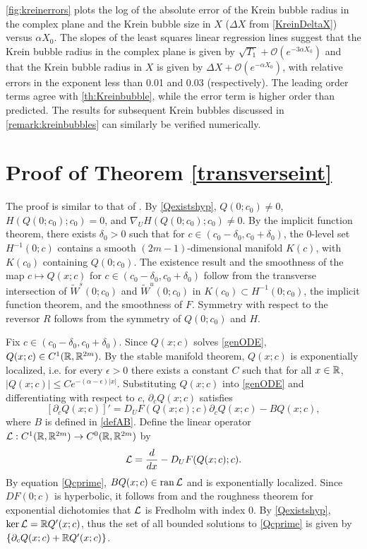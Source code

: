 \documentclass[12pt]{elsarticle}
\theoremstyle{plain}
\theoremstyle{definition}
\theoremstyle{remark}
\numberwithin{theorem}{section}
\numberwithin{equation}{section}
\begin{document}
\cref{fig:kreinerrors} plots the log of the absolute error of the Krein bubble radius in the complex plane and the Krein bubble size in $X$ ($\Delta X$ from \cref{KreinDeltaX}) versus $\alpha X_0$. The slopes of the least squares linear regression lines suggest that the Krein bubble radius in the complex plane is given by $\sqrt{T_1} + \mathcal{O}(e^{-3 \alpha X_0})$ and that the Krein bubble radius in $X$ is given by $\Delta X + \mathcal{O}(e^{-\alpha X_0})$, with relative errors in the exponent less than 0.01 and 0.03 (respectively). The leading order terms agree with \cref{th:Kreinbubble}, while the error term is higher order than predicted. The results for subsequent Krein bubbles discussed in \cref{remark:kreinbubbles} can similarly be verified numerically.

\section{Proof of Theorem \ref{transverseint}}\label{sec:transverseintproof}

The proof is similar to that of \cite[Lemma 6.2 and Lemma 6.4]{Kapitula2020}. By \cref{Qexistshyp}, $Q(0; c_0) \neq 0$, $H(Q(0; c_0); c_0) = 0$, and $\nabla_U H(Q(0; c_0); c_0) \neq 0$. By the implicit function theorem, there exists $\delta_0 > 0$ such that for $c \in (c_0 - \delta_0, c_0 + \delta_0)$, the 0-level set $H^{-1}(0; c)$ contains a smooth $(2m-1)$-dimensional manifold $K(c)$, with $K(c_0)$ containing $Q(0; c_0)$. The existence result and the smoothness of the map $c \mapsto Q(x; c)$ for $c \in (c_0 - \delta_0, c_0 + \delta_0)$ follow from the transverse intersection of $\tilde{W}^s(0; c_0)$ and $\tilde{W}^u(0; c_0)$ in $K(c_0) \subset H^{-1}(0; c_0)$, the implicit function theorem, and the smoothness of $F$. Symmetry with respect to the reversor $R$ follows from the symmetry of $Q(0; c_0)$ and $H$.

Fix $c \in (c_0 - \delta_0, c_0 + \delta_0)$. Since $Q(x; c)$ solves \cref{genODE}, $Q(x; c) \in C^1(\mathbb{R}, \mathbb{R}^{2m})$. By the stable manifold theorem, $Q(x; c)$ is exponentially localized, i.e. for every $\epsilon > 0$ there exists a constant $C$ such that for all $x \in \mathbb{R}$, $|Q(x; c)| \leq C e^{-(\alpha - \epsilon)|x|}$. Substituting $Q(x; c)$ into \cref{genODE} and differentiating with respect to $c$, $\partial_c Q(x; c)$ satisfies
\begin{equation}\label{Qcprime}
[\partial_c Q(x; c)]' = D_U F(Q(x;c); c) \partial_c Q(x; c) - B Q(x;c),
\end{equation}
where $B$ is defined in \cref{defAB}. Define the linear operator $\mathcal{L}: C^1(\mathbb{R}, \mathbb{R}^{2m}) \rightarrow C^0(\mathbb{R}, \mathbb{R}^{2m})$ by
\begin{equation}\label{defLtv}
\mathcal{L} = \frac{d}{dx} - D_U F(Q(x;c); c).
\end{equation}
By equation \cref{Qcprime}, $B Q(x;c) \in \operatorname{ran} \mathcal{L}$ and is exponentially localized. Since $DF(0; c)$ is hyperbolic, it follows from \cite[Lemma~4.2]{Palmer1984} and the roughness theorem for exponential dichotomies \cite{Coppel1978} that $\mathcal{L}$ is Fredholm with index 0. By \cref{Qexistshyp}, $\mathop\mathrm{ker}\nolimits \mathcal{L} = \mathbb{R} Q'(x; c)$, thus the set of all bounded solutions to \cref{Qcprime} is given by $\{\partial_c Q(x; c) + \mathbb{R} Q'(x; c)\}$.
\end{document}

